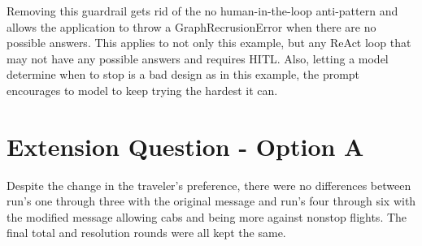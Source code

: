 \documentclass[
  11pt,
  letterpaper,
  DIV=11,
  numbers=noendperiod]{scrartcl}
\begin{document}
Removing this guardrail gets rid of the no human-in-the-loop
anti-pattern and allows the application to throw a GraphRecrusionError
when there are no possible answers. This applies to not only this
example, but any ReAct loop that may not have any possible answers and
requires HITL. Also, letting a model determine when to stop is a bad
design as in this example, the prompt encourages to model to keep trying
the hardest it can.

\section{Extension Question - Option
A}\label{extension-question---option-a}

Despite the change in the traveler's preference, there were no
differences between run's one through three with the original message
and run's four through six with the modified message allowing cabs and
being more against nonstop flights. The final total and resolution
rounds were all kept the same.
\end{document}
